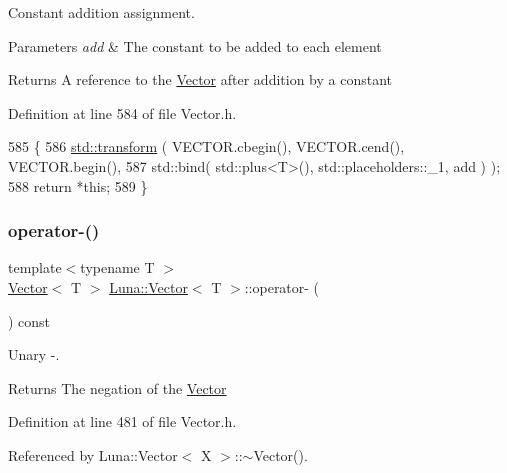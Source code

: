 Constant addition assignment. 


\begin{DoxyParams}{Parameters}
{\em add} & The constant to be added to each element \\
\hline
\end{DoxyParams}
\begin{DoxyReturn}{Returns}
A reference to the \hyperlink{classLuna_1_1Vector}{Vector} after addition by a constant 
\end{DoxyReturn}


Definition at line 584 of file Vector.\+h.


\begin{DoxyCode}
585   \{
586     \hyperlink{namespaceHeat__plot_aeaa6785bedcad63b4bd40e8cb1bad8a0}{std::transform} ( VECTOR.cbegin(), VECTOR.cend(), VECTOR.begin(),
587                      std::bind( std::plus<T>(), std::placeholders::\_1, add ) );
588     \textcolor{keywordflow}{return} *\textcolor{keyword}{this};
589   \}
\end{DoxyCode}
\mbox{\label{classLuna_1_1Vector_a8b2f1a6d3c51d317243c2e832411f26d}} 
\subsubsection{\texorpdfstring{operator-\/()}{operator-()}\hspace{0.1cm}{\footnotesize\ttfamily [1/2]}}
{\footnotesize\ttfamily template$<$typename T $>$ \\
\hyperlink{classLuna_1_1Vector}{Vector}$<$ T $>$ \hyperlink{classLuna_1_1Vector}{Luna\+::\+Vector}$<$ T $>$\+::operator-\/ (\begin{DoxyParamCaption}{ }\end{DoxyParamCaption}) const\hspace{0.3cm}{\ttfamily [inline]}}



Unary -\/. 

\begin{DoxyReturn}{Returns}
The negation of the \hyperlink{classLuna_1_1Vector}{Vector} 
\end{DoxyReturn}


Definition at line 481 of file Vector.\+h.



Referenced by Luna\+::\+Vector$<$ X $>$\+::$\sim$\+Vector().


